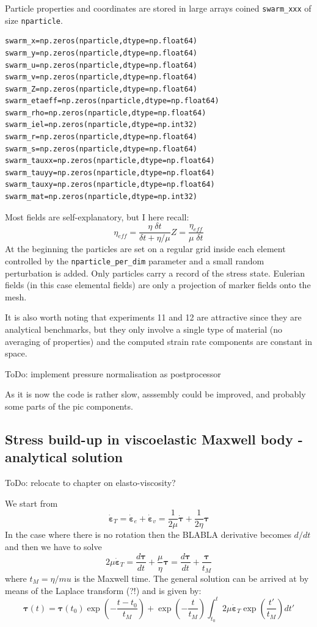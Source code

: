 Particle properties and coordinates are stored in large arrays 
coined {\tt swarm\_xxx} of size {\tt nparticle}. 
\begin{lstlisting}
swarm_x=np.zeros(nparticle,dtype=np.float64)  
swarm_y=np.zeros(nparticle,dtype=np.float64)  
swarm_u=np.zeros(nparticle,dtype=np.float64)  
swarm_v=np.zeros(nparticle,dtype=np.float64)  
swarm_Z=np.zeros(nparticle,dtype=np.float64)  
swarm_etaeff=np.zeros(nparticle,dtype=np.float64)  
swarm_rho=np.zeros(nparticle,dtype=np.float64)  
swarm_iel=np.zeros(nparticle,dtype=np.int32)  
swarm_r=np.zeros(nparticle,dtype=np.float64)  
swarm_s=np.zeros(nparticle,dtype=np.float64)  
swarm_tauxx=np.zeros(nparticle,dtype=np.float64)  
swarm_tauyy=np.zeros(nparticle,dtype=np.float64)  
swarm_tauxy=np.zeros(nparticle,dtype=np.float64)  
swarm_mat=np.zeros(nparticle,dtype=np.int32)  
\end{lstlisting}
Most fields are self-explanatory, but I here recall:
\[
\eta_{eff} = \frac{\eta \;  \delta t}{\delta t + \eta/\mu}
Z = \frac{\eta_{eff}}{\mu \; \delta t}
\]
At the beginning the particles are set on a regular grid inside each element
controlled by the {\tt nparticle\_per\_dim} parameter and a small 
random perturbation is added.
Only particles carry a record of the stress state. Eulerian fields (in this case elemental
fields) are only a projection of marker fields onto the mesh. 

It is also worth noting that experiments 11 and 12 are 
attractive since they are analytical benchmarks, 
but they only involve a single type of material (no averaging of 
properties) and the computed strain rate components are constant in 
space.


ToDo: implement pressure normalisation as postprocessor

As it is now the code is rather slow, asssembly could be 
improved, and probably some parts of the pic components.

\newpage
\subsection*{Stress build-up in viscoelastic Maxwell body - analytical solution}

{\color{red} ToDo: relocate to chapter on elasto-viscosity?}

We start from 
\[
\dot{\bm \varepsilon}_T = \dot{\bm \varepsilon}_e +\dot{\bm \varepsilon}_v
=\frac{1}{2\mu} \dot{\bm \tau} + \frac{1}{2\eta} {\bm \tau} 
\]
In the case where there is no rotation then the BLABLA derivative becomes $d/dt$
and then 
we have to solve 
\[
2 \mu \dot{\bm \varepsilon}_T 
= \frac{d {\bm \tau}}{dt} + \frac{\mu}{\eta} {\bm \tau}
= \frac{d {\bm \tau}}{dt} + \frac{{\bm \tau}}{t_M}
\]
where $t_M=\eta/mu$ is the Maxwell time. The general solution can be arrived at 
by means of the Laplace transform (?!) and is given by:
\[
{\bm \tau}(t) = {\bm \tau}(t_0) \exp\left( -\frac{t-t_0}{t_M} \right) + \exp \left(-\frac{t}{t_M}\right)
\int_{t_0}^{t} 2 \mu \dot{\bm \varepsilon}_T  \exp \left(\frac{t'}{t_M}\right) dt'
\]

